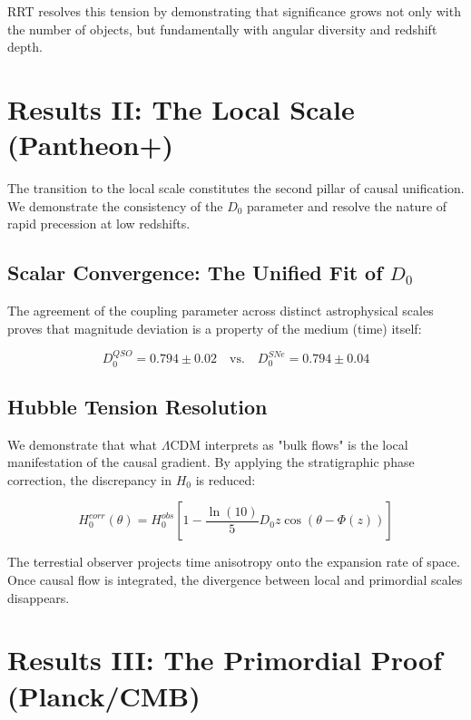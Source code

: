 \documentclass[12pt, a4paper]{article}
\begin{document}
RRT resolves this tension by demonstrating that significance grows not only with the number of objects, but fundamentally with angular diversity and redshift depth.

\section{Results II: The Local Scale (Pantheon+)}

The transition to the local scale constitutes the second pillar of causal unification. We demonstrate the consistency of the $D_0$ parameter and resolve the nature of rapid precession at low redshifts.

\subsection{Scalar Convergence: The Unified Fit of \texorpdfstring{$D_0$}{D0}}

The agreement of the coupling parameter across distinct astrophysical scales proves that magnitude deviation is a property of the medium (time) itself:

\begin{equation}
D_0^{QSO} = 0.794 \pm 0.02 \quad \text{vs.} \quad D_0^{SNe} = 0.794 \pm 0.04
\end{equation}

\subsection{Hubble Tension Resolution}

We demonstrate that what $\Lambda$CDM interprets as "bulk flows" is the local manifestation of the causal gradient. By applying the stratigraphic phase correction, the discrepancy in $H_0$ is reduced:

\begin{equation}
H_0^{corr}(\theta) = H_0^{obs} \left[ 1 - \frac{\ln(10)}{5} D_0 z \cos(\theta - \Phi(z)) \right]
\end{equation}

The terrestial observer projects time anisotropy onto the expansion rate of space. Once causal flow is integrated, the divergence between local and primordial scales disappears.

\section{Results III: The Primordial Proof (Planck/CMB)}
\end{document}
